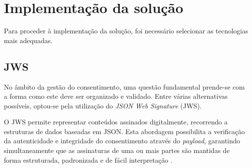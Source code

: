 


\section{Implementação da solução}

Para proceder à implementação da solução, foi necessário selecionar as tecnologias mais adequadas.

\subsection{JWS}

No âmbito da gestão do consentimento, uma questão fundamental prende-se com a forma como este deve ser organizado e validado. Entre várias alternativas possíveis, optou-se pela utilização do \textit{JSON Web Signature} (JWS).  

O JWS permite representar conteúdos assinados digitalmente, recorrendo a estruturas de dados baseadas em JSON. Esta abordagem possibilita a verificação da autenticidade e integridade do consentimento através do \textit{payload}, garantindo simultaneamente que as assinaturas de uma ou mais partes são mantidas de forma estruturada, padronizada e de fácil interpretação \citep{rfc7515}.

